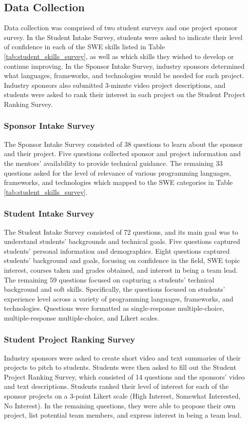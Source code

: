 \subsection{Data Collection}
Data collection was comprised of two student surveys and one project sponsor survey. In the Student Intake Survey, students were asked to indicate their level of confidence in each of the SWE skills listed in Table \ref{tab:student_skills_survey}, as well as which skills they wished to develop or continue improving. In the Sponsor Intake Survey, industry sponsors determined what languages, frameworks, and technologies would be needed for each project. Industry sponsors also submitted 3-minute video project descriptions, and students were asked to rank their interest in each project on the Student Project Ranking Survey. 


\subsubsection{Sponsor Intake Survey}
The Sponsor Intake Survey consisted of 38 questions to learn about the sponsor and their project. Five questions collected sponsor and project information and the mentors' availability to provide technical guidance. The remaining 33 questions asked for the level of relevance of various programming languages, frameworks, and technologies which mapped to the SWE categories in Table \ref{tab:student_skills_survey}.


\subsubsection{Student Intake Survey}

The Student Intake Survey consisted of 72 questions, and its main goal was to understand students' backgrounds and technical goals. Five questions captured students' personal information and demographics. Eight questions captured students' background and goals, focusing on confidence in the field, SWE topic interest, courses taken and grades obtained, and interest in being a team lead. The remaining 59 questions focused on capturing a students' technical background and soft skills. Specifically, the questions focused on students' experience level across a variety of programming languages, frameworks, and technologies. Questions were formatted as single-response multiple-choice, multiple-response multiple-choice, and Likert scales.



\subsubsection{Student Project Ranking Survey}
Industry sponsors were asked to create short video and text summaries of their projects to pitch to students. Students were then asked to fill out the Student Project Ranking Survey, which consisted of 14 questions and the sponsors' video and text descriptions. Students ranked their level of interest for each of the sponsor projects on a 3-point Likert scale (High Interest, Somewhat Interested, No Interest). In the remaining questions, they were able to propose their own project, list potential team members, and express interest in being a team lead.

